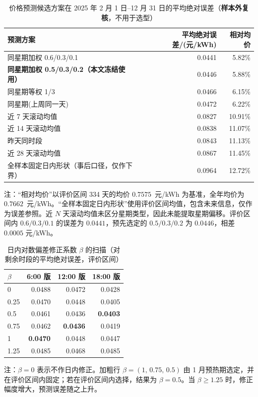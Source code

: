 \begin{table}[htbp]
  \centering
  \caption{价格预测候选方案在 2025 年 2 月 1 日--12 月 31 日的平均绝对误差（\textbf{样本外复核}，不用于选型）}
  \label{tab:p4-forecast}
  \small
  \begin{tabular}{lrr}
    \toprule
    预测方案 & 平均绝对误差/(元/kWh) & 相对均价 \\
    \midrule
    同星期加权 0.6/0.3/0.1 & 0.0441 & 5.82\% \\
    \textbf{同星期加权 0.5/0.3/0.2（本文冻结使用）} & 0.0446 & 5.88\% \\
    同星期等权 1/3 & 0.0466 & 6.15\% \\
    同星期(上周同一天) & 0.0472 & 6.22\% \\
    近 7 天滚动均值 & 0.0827 & 10.91\% \\
    近 14 天滚动均值 & 0.0838 & 11.07\% \\
    昨天同时段 & 0.0843 & 11.13\% \\
    近 28 天滚动均值 & 0.0867 & 11.45\% \\
    全样本固定日内形状（事后口径，仅作下界） & 0.0964 & 12.72\% \\
    \bottomrule
  \end{tabular}
  \par\vspace{2pt}
  \begin{minipage}{\textwidth}\footnotesize
    注：“相对均价”以评价区间 334 天的均价 $0.7575$~元/kWh 为基准，全年均价为 $0.7662$~元/kWh。“全样本固定日内形状”使用评价区间均值，包含未来信息，仅作为误差参照。近 $N$ 天滚动均值未区分星期类型，因此未能提取星期偏移。评价区间内 $0.6/0.3/0.1$ 的误差为 $0.0441$，预先选定的 $0.5/0.3/0.2$ 为 $0.0446$，相差 $0.0005$ 元/kWh。
  \end{minipage}
\end{table}

\begin{table}[htbp]
  \centering
  \caption{日内对数偏差修正系数 $\beta$ 的扫描（对剩余时段的平均绝对误差，评价区间）}
  \label{tab:p4-beta}
  \small
  \begin{tabular}{lrrr}
    \toprule
    $\beta$ & 6:00 版 & 12:00 版 & 18:00 版 \\
    \midrule
    0 & 0.0488 & 0.0472 & 0.0428 \\
    0.25 & 0.0470 & 0.0448 & 0.0405 \\
    0.5 & 0.0461 & 0.0436 & \textbf{0.0403} \\
    0.75 & 0.0462 & \textbf{0.0436} & 0.0419 \\
    1 & \textbf{0.0470} & 0.0448 & 0.0447 \\
    1.25 & 0.0485 & 0.0468 & 0.0485 \\
    \bottomrule
  \end{tabular}
  \par\vspace{2pt}
  \begin{minipage}{\textwidth}\footnotesize
    注：$\beta=0$ 表示不作日内修正。加粗行 $\beta=(1,\,0.75,\,0.5)$ 由 1 月预热期选定，并在评价区间内固定；若在评价区间内选择，结果为 $\beta=0.5$。当 $\beta\ge1.25$ 时，修正幅度增大，预测误差随之上升。
  \end{minipage}
\end{table}

